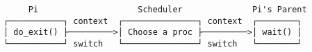 \documentclass[varwidth=50em,crop]{standalone}
\begin{document}
\begin{verbatim}
     Pi                    Scheduler              Pi's Parent
┌───────────┐ context  ┌───────────────┐ context  ┌────────┐
│ do_exit() ├─────────>│ Choose a proc ├─────────>│ wait() │
└───────────┘ switch   └───────────────┘ switch   └────────┘
\end{verbatim}
\end{document}
